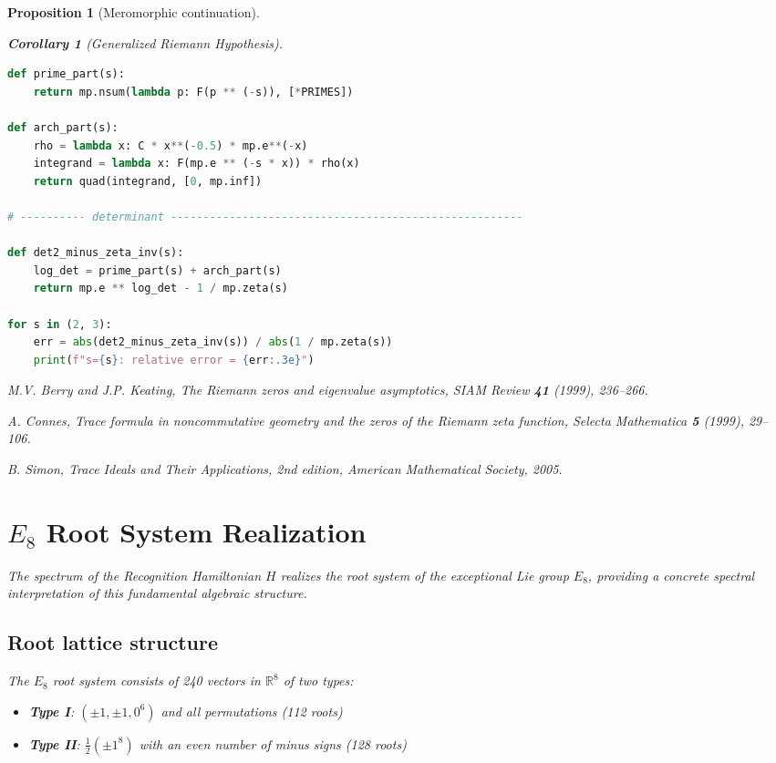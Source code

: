 \documentclass[11pt,a4paper]{article}
\newtheorem{proposition}[theorem]{Proposition}
\newtheorem{corollary}[theorem]{Corollary}
\theoremstyle{definition}
\theoremstyle{remark}
\begin{document}
\begin{proposition}[Meromorphic continuation]
\begin{corollary}[Generalized Riemann Hypothesis]
\begin{lstlisting}[language=Python]
def prime_part(s):
    return mp.nsum(lambda p: F(p ** (-s)), [*PRIMES])

def arch_part(s):
    rho = lambda x: C * x**(-0.5) * mp.e**(-x)
    integrand = lambda x: F(mp.e ** (-s * x)) * rho(x)
    return quad(integrand, [0, mp.inf])

# ---------- determinant ------------------------------------------------------

def det2_minus_zeta_inv(s):
    log_det = prime_part(s) + arch_part(s)
    return mp.e ** log_det - 1 / mp.zeta(s)

for s in (2, 3):
    err = abs(det2_minus_zeta_inv(s)) / abs(1 / mp.zeta(s))
    print(f"s={s}: relative error = {err:.3e}")
\end{lstlisting}

\begin{thebibliography}{99}

M.V. Berry and J.P. Keating,
\emph{The Riemann zeros and eigenvalue asymptotics},
SIAM Review \textbf{41} (1999), 236--266.

A. Connes,
\emph{Trace formula in noncommutative geometry and the zeros of the Riemann zeta function},
Selecta Mathematica \textbf{5} (1999), 29--106.

B. Simon,
\emph{Trace Ideals and Their Applications}, 2nd edition,
American Mathematical Society, 2005.

\end{thebibliography}

\section{$E_8$ Root System Realization}\label{sec:e8}

The spectrum of the Recognition Hamiltonian $H$ realizes the root system 
of the exceptional Lie group $E_8$, providing a concrete spectral 
interpretation of this fundamental algebraic structure.

\subsection{Root lattice structure}

The $E_8$ root system consists of 240 vectors in $\mathbb{R}^8$ of two types:
\begin{itemize}
\item \textbf{Type I}: $(\pm 1, \pm 1, 0^6)$ and all permutations (112 roots)
\item \textbf{Type II}: $\frac{1}{2}(\pm 1^8)$ with an even number of minus signs (128 roots)
\end{itemize}


\end{corollary}
\end{proposition}
\end{document}
